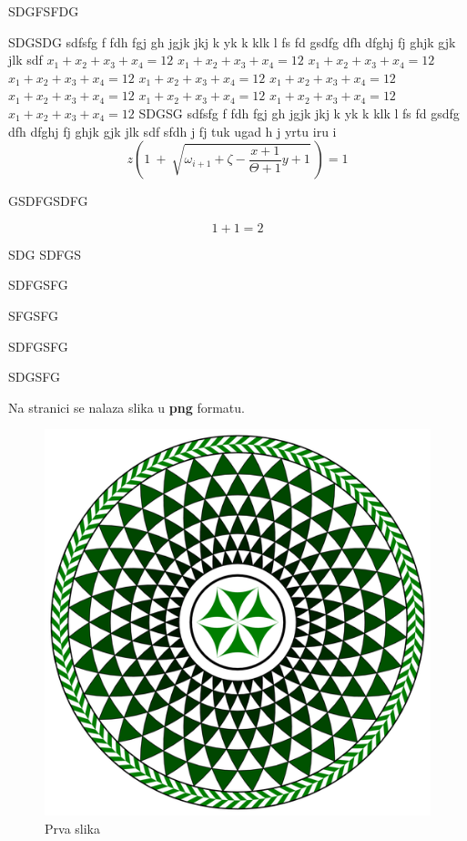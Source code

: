\documentclass[a4paper,twoside,12pt]{memoir} %
\begin{document}
SDGFSFDG


SDGSDG  sdfsfg f fdh fgj gh jgjk jkj k yk k klk l fs fd gsdfg dfh dfghj fj ghjk gjk jlk sdf 
$x_1+x_2+x_3+x_4=12$ $x_1+x_2+x_3+x_4=12$
 $x_1+x_2+x_3+x_4=12$ $x_1+x_2+x_3+x_4=12$ $x_1+x_2+x_3+x_4=12$ $x_1+x_2+x_3+x_4=12$
 $x_1+x_2+x_3+x_4=12$ $x_1+x_2+x_3+x_4=12$ $x_1+x_2+x_3+x_4=12$
$x_1+x_2+x_3+x_4=12$ 
SDGSG sdfsfg f fdh fgj gh jgjk jkj k yk k klk l fs fd gsdfg dfh dfghj fj ghjk gjk jlk sdf sfdh j fj tuk ugad h j yrtu iru i
\[ z \left( 1 \ +\ \sqrt{\omega_{i+1} + \zeta -\frac{x+1}{\Theta +1} y + 1}
\ \right) =  1 \]

GSDFGSDFG



\begin{equation}
\label{eq:jed1}
	1+1=2
\end{equation}

SDG
SDFGS

SDFGSFG


SFGSFG


SDFGSFG


SDGSFG

\label{stranica}
Na stranici \pageref{stranica} se nalaza slika u \textbf{png} formatu.
\begin{figure}[h!t]
\begin{center}
\includegraphics[scale=0.5]{mosaic-from-pompeii.png}
\caption{Prva slika}
\end{center}
\end{figure}
\end{document}
